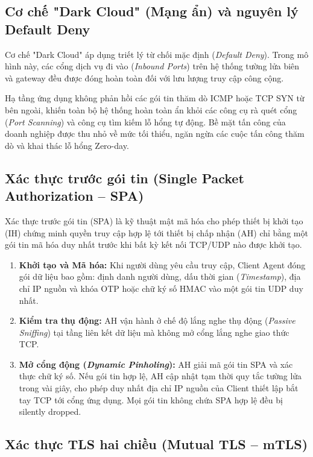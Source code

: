 \subsection{Cơ chế "Dark Cloud" (Mạng ẩn) và nguyên lý Default Deny}
\label{subsec:3_2_1}

Cơ chế "Dark Cloud" áp dụng triết lý từ chối mặc định (\textit{Default Deny}). Trong mô hình này, các cổng dịch vụ đi vào (\textit{Inbound Ports}) trên hệ thống tường lửa biên và gateway đều được đóng hoàn toàn đối với lưu lượng truy cập công cộng. 

Hạ tầng ứng dụng không phản hồi các gói tin thăm dò ICMP hoặc TCP SYN từ bên ngoài, khiến toàn bộ hệ thống hoàn toàn ẩn khỏi các công cụ rà quét cổng (\textit{Port Scanning}) và công cụ tìm kiếm lỗ hổng tự động. Bề mặt tấn công của doanh nghiệp được thu nhỏ về mức tối thiểu, ngăn ngừa các cuộc tấn công thăm dò và khai thác lỗ hổng Zero-day.

\subsection{Xác thực trước gói tin (Single Packet Authorization -- SPA)}
\label{subsec:3_2_2}

Xác thực trước gói tin (SPA) là kỹ thuật mật mã hóa cho phép thiết bị khởi tạo (IH) chứng minh quyền truy cập hợp lệ tới thiết bị chấp nhận (AH) chỉ bằng một gói tin mã hóa duy nhất trước khi bất kỳ kết nối TCP/UDP nào được khởi tạo.

\begin{enumerate}
    \item \textbf{Khởi tạo và Mã hóa:} Khi người dùng yêu cầu truy cập, Client Agent đóng gói dữ liệu bao gồm: định danh người dùng, dấu thời gian (\textit{Timestamp}), địa chỉ IP nguồn và khóa OTP hoặc chữ ký số HMAC vào một gói tin UDP duy nhất.
    \item \textbf{Kiểm tra thụ động:} AH vận hành ở chế độ lắng nghe thụ động (\textit{Passive Sniffing}) tại tầng liên kết dữ liệu mà không mở cổng lắng nghe giao thức TCP.
    \item \textbf{Mở cổng động (\textit{Dynamic Pinholing}):} AH giải mã gói tin SPA và xác thực chữ ký số. Nếu gói tin hợp lệ, AH cập nhật tạm thời quy tắc tường lửa trong vài giây, cho phép duy nhất địa chỉ IP nguồn của Client thiết lập bắt tay TCP tới cổng ứng dụng. Mọi gói tin không chứa SPA hợp lệ đều bị silently dropped.
\end{enumerate}

\subsection{Xác thực TLS hai chiều (Mutual TLS -- mTLS)}
\label{subsec:3_2_3}

